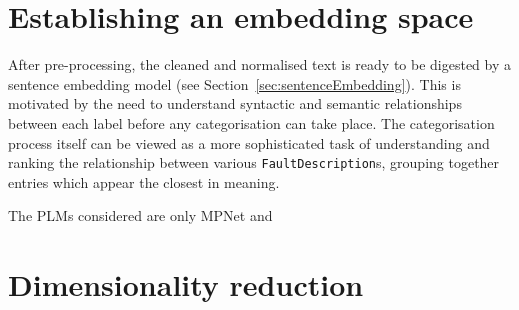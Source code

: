 \documentclass[10pt,oneside]{report}
\begin{document}

\section{Establishing an embedding space}
After pre-processing, the cleaned and normalised text is ready to be digested by a sentence embedding model (see Section~\ref{sec:sentenceEmbedding}). This is motivated by the need to understand syntactic and semantic relationships between each label before any categorisation can take place. The categorisation process itself can be viewed as a more sophisticated task of understanding and ranking the relationship between various \texttt{FaultDescription}s, grouping together entries which appear the closest in meaning.  

The PLMs considered are only MPNet and 


\section{Dimensionality reduction}
\end{document}
